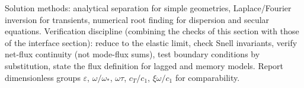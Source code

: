 \begin{summarybox}[Summary]
Solution methods: analytical separation for simple geometries, Laplace/Fourier inversion for transients, numerical root finding for dispersion and secular equations. Verification discipline (combining the checks of this section with those of the interface section): reduce to the elastic limit, check Snell invariants, verify net-flux continuity (not mode-flux sums), test boundary conditions by substitution, state the flux definition for lagged and memory models. Report dimensionless groups $\varepsilon$, $\omega/\omega_*$, $\omega\tau$, $c_T/c_1$, $\xi\omega/c_1$ for comparability.
\end{summarybox}